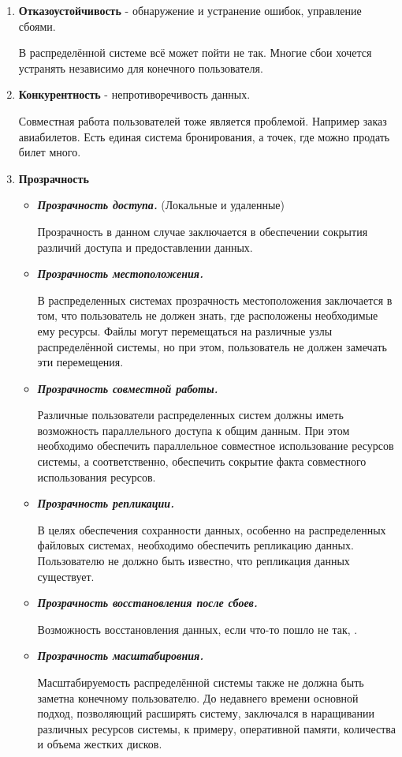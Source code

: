 \begin{enumerate}
\item
\textbf{ Отказоустойчивость} - обнаружение и устранение ошибок, управление сбоями.

В распределённой системе всё может пойти не так.
Многие сбои хочется устранять независимо для конечного пользователя.

\item
\textbf{ Конкурентность} - непротиворечивость данных.

Совместная работа пользователей тоже является проблемой.
Например заказ авиабилетов. Есть единая система бронирования, а точек, где можно продать билет много.

\item
\textbf{ Прозрачность}

\begin{itemize}
\item
\textit{\textbf{ Прозрачность доступа.}} (Локальные и удаленные)

Прозрачность в данном случае заключается в обеспечении сокрытия различий доступа и предоставлении данных.

\item
\textit{ \textbf{Прозрачность местоположения. }}

В распределенных системах прозрачность местоположения заключается в том, что пользователь не должен знать, где расположены необходимые ему ресурсы. 
Файлы могут перемещаться на различные узлы распределённой системы, но при этом, пользователь не должен замечать эти перемещения.

\item
\textit{\textbf{ Прозрачность совместной работы.}}

Различные пользователи распределенных систем должны иметь возможность параллельного доступа к общим данным. При этом необходимо обеспечить параллельное совместное использование ресурсов системы, а соответственно, обеспечить сокрытие факта совместного использования ресурсов.

\item
\textit{\textbf{ Прозрачность репликации. }}

В целях обеспечения сохранности данных, особенно на распределенных файловых системах, необходимо обеспечить репликацию данных. Пользователю не должно быть известно, что репликация данных существует.

\item
\textit{\textbf{ Прозрачность восстановления после сбоев.}}

Возможность восстановления данных, если что-то пошло не так, .

\item
\textit{\textbf{ Прозрачность масштабировния.}}

Масштабируемость распределённой системы также не должна быть заметна конечному пользователю. До недавнего времени основной подход, позволяющий расширять систему, заключался в наращивании различных ресурсов системы, к примеру, оперативной памяти, количества и объема жестких дисков. 
\end{itemize}

\end{enumerate}
